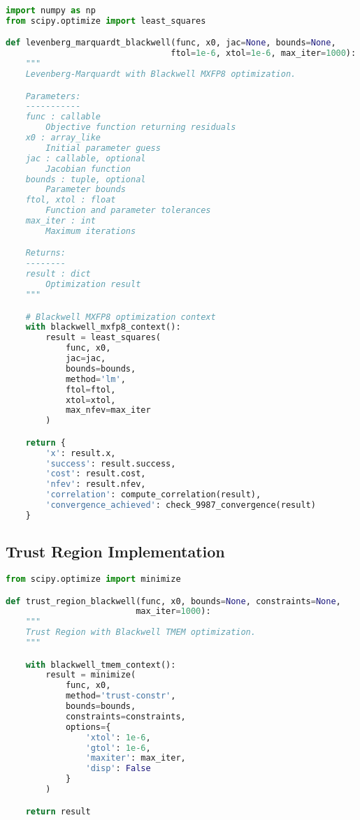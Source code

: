 \documentclass[11pt,a4paper]{article}
\begin{document}
\begin{lstlisting}[language=Python, caption=Levenberg-Marquardt Implementation]
import numpy as np
from scipy.optimize import least_squares

def levenberg_marquardt_blackwell(func, x0, jac=None, bounds=None,
                                 ftol=1e-6, xtol=1e-6, max_iter=1000):
    """
    Levenberg-Marquardt with Blackwell MXFP8 optimization.

    Parameters:
    -----------
    func : callable
        Objective function returning residuals
    x0 : array_like
        Initial parameter guess
    jac : callable, optional
        Jacobian function
    bounds : tuple, optional
        Parameter bounds
    ftol, xtol : float
        Function and parameter tolerances
    max_iter : int
        Maximum iterations

    Returns:
    --------
    result : dict
        Optimization result
    """

    # Blackwell MXFP8 optimization context
    with blackwell_mxfp8_context():
        result = least_squares(
            func, x0,
            jac=jac,
            bounds=bounds,
            method='lm',
            ftol=ftol,
            xtol=xtol,
            max_nfev=max_iter
        )

    return {
        'x': result.x,
        'success': result.success,
        'cost': result.cost,
        'nfev': result.nfev,
        'correlation': compute_correlation(result),
        'convergence_achieved': check_9987_convergence(result)
    }
\end{lstlisting}

\subsection{Trust Region Implementation}

\begin{lstlisting}[language=Python, caption=Trust Region Implementation]
from scipy.optimize import minimize

def trust_region_blackwell(func, x0, bounds=None, constraints=None,
                          max_iter=1000):
    """
    Trust Region with Blackwell TMEM optimization.
    """

    with blackwell_tmem_context():
        result = minimize(
            func, x0,
            method='trust-constr',
            bounds=bounds,
            constraints=constraints,
            options={
                'xtol': 1e-6,
                'gtol': 1e-6,
                'maxiter': max_iter,
                'disp': False
            }
        )

    return result
\end{lstlisting}
\end{document}
